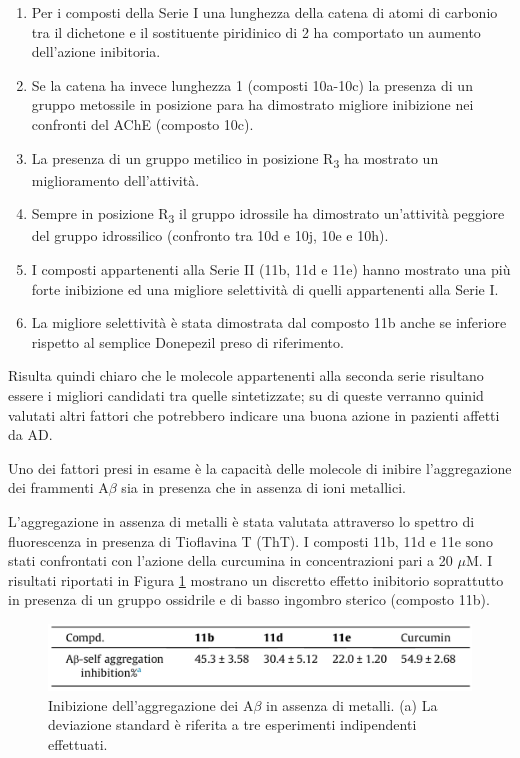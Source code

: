 \documentclass[a4paper, 12pt]{article}
\begin{document}
\begin{enumerate}
	\item Per i composti della Serie I una lunghezza della catena di atomi di carbonio tra il dichetone e il sostituente piridinico di 2 ha comportato un aumento dell'azione inibitoria.
	\item Se la catena ha invece lunghezza 1 (composti 10a-10c) la presenza di un gruppo metossile in posizione para ha dimostrato migliore inibizione nei confronti del AChE (composto 10c).
	\item La presenza di un gruppo metilico in posizione R\textsubscript{3} ha mostrato un miglioramento dell'attività.
	\item Sempre in posizione R\textsubscript{3} il gruppo idrossile ha dimostrato un'attività peggiore del gruppo idrossilico (confronto tra 10d e 10j, 10e e 10h).
	\item I composti appartenenti alla Serie II (11b, 11d e 11e) hanno mostrato una più forte inibizione ed una migliore selettività di quelli appartenenti alla Serie I.
	\item La migliore selettività è stata dimostrata dal composto 11b anche se inferiore rispetto al semplice Donepezil preso di riferimento.
\end{enumerate}

Risulta quindi chiaro che le molecole appartenenti alla seconda serie risultano essere i migliori candidati tra quelle sintetizzate; su di queste verranno quinid valutati altri fattori che potrebbero indicare una buona azione in pazienti affetti da AD.

Uno dei fattori presi in esame è la capacità delle molecole di inibire l'aggregazione dei frammenti A$\beta$ sia in presenza che in assenza di ioni metallici.

L'aggregazione in assenza di metalli è stata valutata attraverso lo spettro di fluorescenza in presenza di Tioflavina T (ThT). I composti 11b, 11d e 11e sono stati confrontati con l'azione della curcumina in concentrazioni pari a 20 $\mu$M. I risultati riportati in Figura \ref{fig:selfab_curcdone} mostrano un discretto effetto inibitorio soprattutto in presenza di un gruppo ossidrile e di basso ingombro sterico (composto 11b).

\begin{figure}[H]
	\centering
	\includegraphics[width=.8\linewidth]{immagini/selfab_curcdone.png}
	\caption{Inibizione dell'aggregazione dei A$\beta$ in assenza di metalli. (a) La deviazione standard è riferita a tre esperimenti indipendenti effettuati.}
	\label{fig:selfab_curcdone}
\end{figure}
\end{document}
